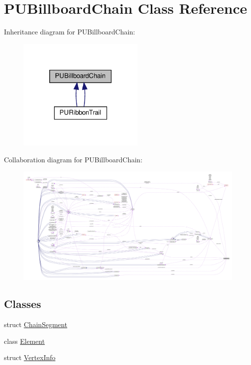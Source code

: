 \hypertarget{classPUBillboardChain}{}\section{P\+U\+Billboard\+Chain Class Reference}
\label{classPUBillboardChain}


Inheritance diagram for P\+U\+Billboard\+Chain\+:
\nopagebreak
\begin{figure}[H]
\begin{center}
\leavevmode
\includegraphics[width=174pt]{classPUBillboardChain__inherit__graph}
\end{center}
\end{figure}


Collaboration diagram for P\+U\+Billboard\+Chain\+:
\nopagebreak
\begin{figure}[H]
\begin{center}
\leavevmode
\includegraphics[width=350pt]{classPUBillboardChain__coll__graph}
\end{center}
\end{figure}
\subsection*{Classes}
\begin{DoxyCompactItemize}
\item 
struct \hyperlink{structPUBillboardChain_1_1ChainSegment}{Chain\+Segment}
\item 
class \hyperlink{classPUBillboardChain_1_1Element}{Element}
\item 
struct \hyperlink{structPUBillboardChain_1_1VertexInfo}{Vertex\+Info}
\end{DoxyCompactItemize}
